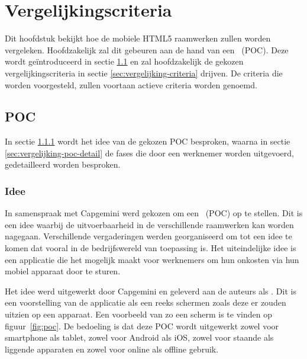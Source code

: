
\chapter{Vergelijkingscriteria}
\label{chap:vergelijkingscriteria}

Dit hoofdstuk bekijkt hoe de mobiele HTML5 raamwerken zullen worden vergeleken.
Hoofdzakelijk zal dit gebeuren aan de hand van een ~(POC).
Deze wordt geïntroduceerd in sectie \ref{sec:vergelijking-poc} en zal hoofdzakelijk de gekozen vergelijkingscriteria in sectie \ref{sec:vergelijking-criteria} drijven.
De criteria die worden voorgesteld, zullen voortaan actieve criteria worden genoemd.


\section{POC}
\label{sec:vergelijking-poc}
In sectie \ref{sec:vergelijking-poc-idee} wordt het idee van de gekozen POC besproken, waarna in sectie \ref{sec:vergelijking-poc-detail} de fases die door een werknemer worden uitgevoerd, gedetailleerd worden besproken.

\subsection{Idee}
\label{sec:vergelijking-poc-idee}

In samenspraak met Capgemini werd gekozen om een ~(POC) op te stellen.
Dit is een idee waarbij de uitvoerbaarheid in de verschillende raamwerken kan worden nagegaan.
Verschillende vergaderingen werden georganiseerd om tot een idee te komen dat vooral in de bedrijfswereld van toepassing is.
Het uiteindelijke idee is een applicatie die het mogelijk maakt voor werknemers om hun onkosten via hun mobiel apparaat door te sturen.

Het idee werd uitgewerkt door Capgemini en geleverd aan de auteurs als .
Dit is een voorstelling van de applicatie als een reeks schermen zoals deze er zouden uitzien op een apparaat. 
Een voorbeeld van zo een scherm is te vinden op figuur~\ref{fig:poc}. 
De bedoeling is dat deze POC wordt uitgewerkt zowel voor smartphone als tablet, zowel voor Android als iOS, zowel voor staande als liggende apparaten en zowel voor online als offline gebruik.

